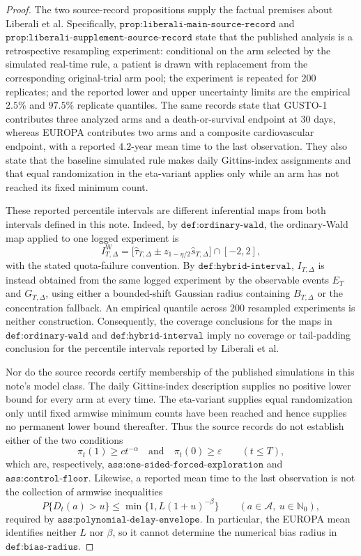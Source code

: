 \documentclass{article}
\begin{document}
\begin{proof}
The two source-record propositions supply the factual premises about Liberali et al.  Specifically, \(\texttt{prop:liberali-main-source-record}\) and \(\texttt{prop:liberali-supplement-source-record}\) state that the published analysis is a retrospective resampling experiment: conditional on the arm selected by the simulated real-time rule, a patient is drawn with replacement from the corresponding original-trial arm pool; the experiment is repeated for \(200\) replicates; and the reported lower and upper uncertainty limits are the empirical \(2.5\%\) and \(97.5\%\) replicate quantiles.  The same records state that GUSTO-1 contributes three analyzed arms and a death-or-survival endpoint at \(30\) days, whereas EUROPA contributes two arms and a composite cardiovascular endpoint, with a reported \(4.2\)-year mean time to the last observation.  They also state that the baseline simulated rule makes daily Gittins-index assignments and that equal randomization in the eta-variant applies only while an arm has not reached its fixed minimum count.

These reported percentile intervals are different inferential maps from both intervals defined in this note.  Indeed, by \(\texttt{def:ordinary-wald}\), the ordinary-Wald map applied to one logged experiment is
\[
 I_{T,\Delta}^{\mathrm W}
 =\bigl[\widehat\tau_{T,\Delta}
 \mathbin{\pm}z_{1-\eta/2}\widehat s_{T,\Delta}\bigr]\cap[-2,2],
\tag{1}
\]
with the stated quota-failure convention.  By \(\texttt{def:hybrid-interval}\), \(I_{T,\Delta}\) is instead obtained from the same logged experiment by the observable events \(E_T\) and \(G_{T,\Delta}\), using either a bounded-shift Gaussian radius containing \(B_{T,\Delta}\) or the concentration fallback.  An empirical quantile across \(200\) resampled experiments is neither construction.  Consequently, the coverage conclusions for the maps in \(\texttt{def:ordinary-wald}\) and \(\texttt{def:hybrid-interval}\) imply no coverage or tail-padding conclusion for the percentile intervals reported by Liberali et al.

Nor do the source records certify membership of the published simulations in this note's model class.  The daily Gittins-index description supplies no positive lower bound for every arm at every time.  The eta-variant supplies equal randomization only until fixed armwise minimum counts have been reached and hence supplies no permanent lower bound thereafter.  Thus the source records do not establish either of the two conditions
\[
 \pi_t(1)\geq c t^{-\alpha}
 \quad\text{and}\quad
 \pi_t(0)\geq\varepsilon
 \qquad (t\leq T),
\tag{2}
\]
which are, respectively, \(\texttt{ass:one-sided-forced-exploration}\) and \(\texttt{ass:control-floor}\).  Likewise, a reported mean time to the last observation is not the collection of armwise inequalities
\[
 P\{D_t(a)>u\}
 \leq \min\{1,L(1+u)^{-\beta}\}
 \qquad
 (a\in\mathcal A,\ u\in\mathbb N_0),
\tag{3}
\]
required by \(\texttt{ass:polynomial-delay-envelope}\).  In particular, the EUROPA mean identifies neither \(L\) nor \(\beta\), so it cannot determine the numerical bias radius in \(\texttt{def:bias-radius}\).


\end{proof}
\end{document}
